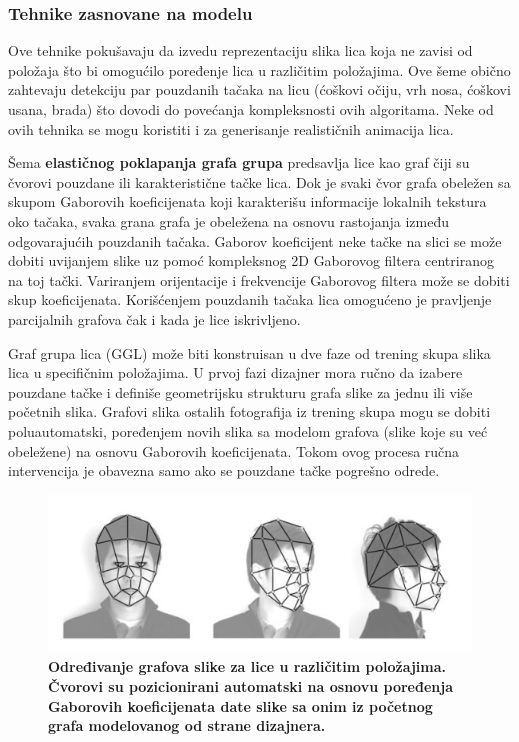 \documentclass[11pt, a4paper]{article}
\begin{document}
\subsubsection{Tehnike zasnovane na modelu}

Ove tehnike pokušavaju da izvedu reprezentaciju slika lica koja ne zavisi od položaja što bi omogućilo poređenje lica u različitim položajima. Ove šeme obično zahtevaju detekciju par pouzdanih tačaka na licu (ćoškovi očiju, vrh nosa, ćoškovi usana, brada) što dovodi do povećanja kompleksnosti ovih algoritama. Neke od ovih tehnika se mogu koristiti i za generisanje realističnih animacija lica.

Šema \textbf{elastičnog poklapanja grafa grupa} predsavlja lice kao graf čiji su čvorovi pouzdane ili karakteristične tačke lica. Dok je svaki čvor grafa obeležen sa skupom Gaborovih koeficijenata koji karakterišu informacije lokalnih tekstura oko tačaka, svaka grana grafa je obeležena na osnovu rastojanja između odgovarajućih pouzdanih tačaka. Gaborov koeficijent neke tačke na slici se može dobiti  uvijanjem slike uz pomoć kompleksnog 2D Gaborovog filtera centriranog na toj tački. Variranjem orijentacije i frekvencije Gaborovog filtera može se dobiti skup koeficijenata. Korišćenjem pouzdanih tačaka lica omogućeno je pravljenje parcijalnih grafova čak i kada je lice iskrivljeno.

Graf grupa lica (GGL) može biti konstruisan u dve faze od trening skupa slika lica u specifičnim položajima. U prvoj fazi dizajner mora ručno da izabere pouzdane tačke i definiše geometrijsku strukturu grafa slike za jednu ili više početnih slika. Grafovi slika ostalih fotografija iz trening skupa mogu se dobiti poluautomatski, poređenjem novih slika sa modelom grafova (slike koje su već obeležene) na osnovu Gaborovih koeficijenata. Tokom ovog procesa ručna intervencija je obavezna samo ako se pouzdane tačke pogrešno odrede.

\begin{figure}[h!]
	\centerline{\includegraphics[width=0.8\linewidth]{face_graph.png}}
	\caption{\textbf{Određivanje grafova slike za lice u različitim položajima. Čvorovi su pozicionirani automatski na osnovu poređenja Gaborovih koeficijenata date slike sa onim iz početnog grafa modelovanog od strane dizajnera. }}
	\label{fig:face_graph}
\end{figure}
\end{document}
